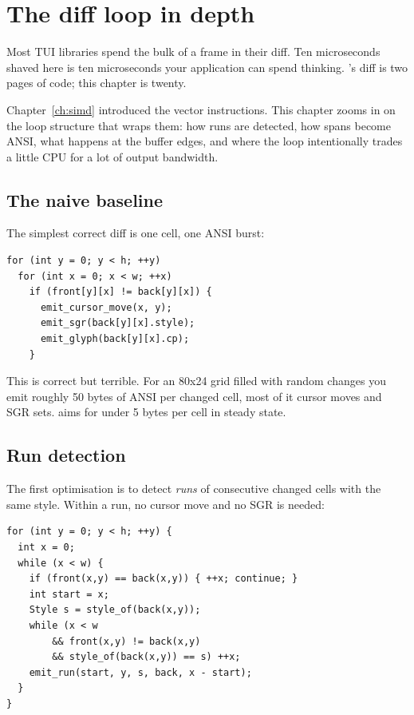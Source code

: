 \chapter{The diff loop in depth}
\label{ch:diffloop}

\begin{aside}
Most TUI libraries spend the bulk of a frame in their diff. Ten
microseconds shaved here is ten microseconds your application can
spend thinking. \maya{}'s diff is two pages of code; this chapter
is twenty.
\end{aside}

Chapter~\ref{ch:simd} introduced the vector instructions. This chapter
zooms in on the loop structure that wraps them: how runs are
detected, how spans become ANSI, what happens at the buffer edges,
and where the loop intentionally trades a little CPU for a lot of
output bandwidth.

\section{The naive baseline}

The simplest correct diff is one cell, one ANSI burst:

\begin{lstlisting}
for (int y = 0; y < h; ++y)
  for (int x = 0; x < w; ++x)
    if (front[y][x] != back[y][x]) {
      emit_cursor_move(x, y);
      emit_sgr(back[y][x].style);
      emit_glyph(back[y][x].cp);
    }
\end{lstlisting}

This is correct but terrible. For an 80x24 grid filled with random
changes you emit roughly 50 bytes of ANSI per changed cell, most of
it cursor moves and SGR sets. \maya{} aims for under 5 bytes per
cell in steady state.

\section{Run detection}

The first optimisation is to detect \emph{runs} of consecutive
changed cells with the same style. Within a run, no cursor move
and no SGR is needed:

\begin{lstlisting}
for (int y = 0; y < h; ++y) {
  int x = 0;
  while (x < w) {
    if (front(x,y) == back(x,y)) { ++x; continue; }
    int start = x;
    Style s = style_of(back(x,y));
    while (x < w
        && front(x,y) != back(x,y)
        && style_of(back(x,y)) == s) ++x;
    emit_run(start, y, s, back, x - start);
  }
}
\end{lstlisting}

